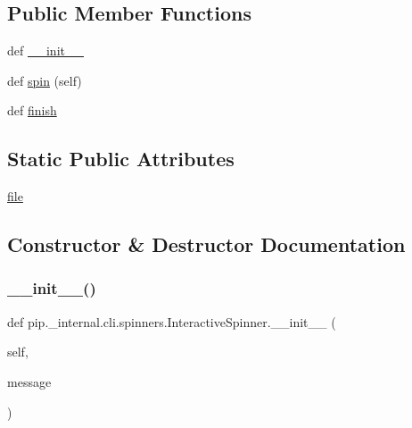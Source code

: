 \subsection*{Public Member Functions}
\begin{DoxyCompactItemize}
\item 
def \hyperlink{classpip_1_1__internal_1_1cli_1_1spinners_1_1InteractiveSpinner_a8ceeafa77eb512d9b1ec81fe18d6cfb4}{\+\_\+\+\_\+init\+\_\+\+\_\+}
\item 
def \hyperlink{classpip_1_1__internal_1_1cli_1_1spinners_1_1InteractiveSpinner_a0497c87d65fd6ac7b8385e3f9a366d86}{spin} (self)
\item 
def \hyperlink{classpip_1_1__internal_1_1cli_1_1spinners_1_1InteractiveSpinner_a3611240d2067090cb1b14547bdcff9db}{finish}
\end{DoxyCompactItemize}
\subsection*{Static Public Attributes}
\begin{DoxyCompactItemize}
\item 
\hyperlink{classpip_1_1__internal_1_1cli_1_1spinners_1_1InteractiveSpinner_a96e49881af81a3edd7b190a2f4fc920e}{file}
\end{DoxyCompactItemize}


\subsection{Constructor \& Destructor Documentation}
\mbox{\label{classpip_1_1__internal_1_1cli_1_1spinners_1_1InteractiveSpinner_a8ceeafa77eb512d9b1ec81fe18d6cfb4}} 
\subsubsection{\texorpdfstring{\+\_\+\+\_\+init\+\_\+\+\_\+()}{\_\_init\_\_()}}
{\footnotesize\ttfamily def pip.\+\_\+internal.\+cli.\+spinners.\+Interactive\+Spinner.\+\_\+\+\_\+init\+\_\+\+\_\+ (\begin{DoxyParamCaption}\item[{}]{self,  }\item[{}]{message }\end{DoxyParamCaption})}



